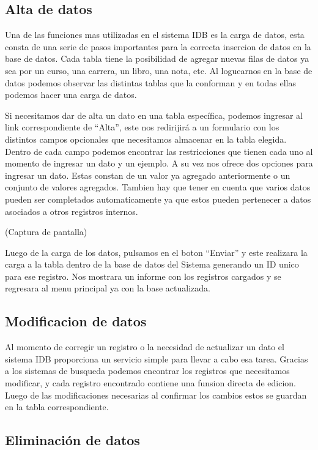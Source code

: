 \documentclass[a4paper,10pt]{article}
\begin{document}
\subsection{Alta de datos}

Una de las funciones mas utilizadas en el sistema IDB es la carga de datos, esta consta de una serie de pasos importantes para la correcta insercion de datos en la base de datos. Cada tabla tiene la posibilidad de agregar nuevas filas de datos ya sea por un curso, una carrera, un libro, una nota, etc. Al loguearnos en la base de datos podemos observar las distintas tablas que la conforman y en todas ellas podemos hacer una carga de datos. 

Si necesitamos dar de alta un dato en una tabla específica, podemos ingresar al link correspondiente de “Alta”, este nos redirijirá a un formulario con los distintos campos opcionales que necesitamos almacenar en la tabla elegida. 
Dentro de cada campo podemos encontrar las restricciones que tienen cada uno al momento de ingresar un dato y un ejemplo. A su vez nos ofrece dos opciones para ingresar un dato. Estas constan de un valor ya agregado anteriormente o un conjunto de valores agregados. Tambien hay que tener en cuenta que varios datos pueden ser completados automaticamente ya que estos pueden pertenecer a datos asociados a otros registros internos. 

(Captura de pantalla)

Luego de la carga de los datos, pulsamos en el boton “Enviar” y este realizara la carga a la tabla dentro de la base de datos del Sistema generando un ID unico para ese registro. Nos mostrara un informe con los registros cargados y se regresara al menu principal ya con la base actualizada.

\subsection{Modificacion de datos}

Al momento de corregir un registro o la necesidad de actualizar un dato el sistema IDB proporciona un servicio simple para llevar a cabo esa tarea. Gracias a los sistemas de busqueda podemos encontrar los registros que necesitamos modificar, y cada registro encontrado contiene una funsion directa de edicion. Luego de las modificaciones necesarias al confirmar los cambios estos se guardan en la tabla correspondiente.
 
\subsection{Eliminación de datos}
\end{document}

